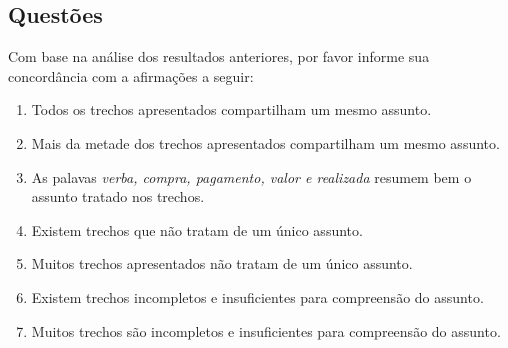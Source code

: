 \newpage

\subsection*{Questões}


Com base na análise dos resultados anteriores, por favor informe sua concordância com a afirmações a seguir:





\begin{enumerate}

\item Todos os trechos apresentados compartilham um mesmo assunto.
\likert

\item Mais da metade dos trechos apresentados compartilham um mesmo assunto.
\likert

\item As palavas \textit{verba, compra, pagamento, valor e realizada} resumem bem o assunto tratado nos trechos.
\likert

\item Existem trechos que não tratam de um único assunto.
\likert

\item Muitos trechos apresentados não tratam de um único assunto. 
\likert

\item Existem trechos incompletos e insuficientes para compreensão do assunto.
\likert

\item Muitos trechos são incompletos e insuficientes para compreensão do assunto.
\likert



\end{enumerate}







